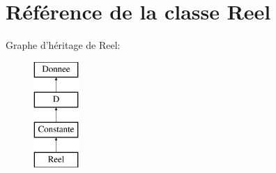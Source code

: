 \hypertarget{class_reel}{\section{Référence de la classe Reel}
\label{class_reel}
}
Graphe d'héritage de Reel\-:\begin{figure}[H]
\begin{center}
\leavevmode
\includegraphics[height=4.000000cm]{class_reel}
\end{center}
\end{figure}
